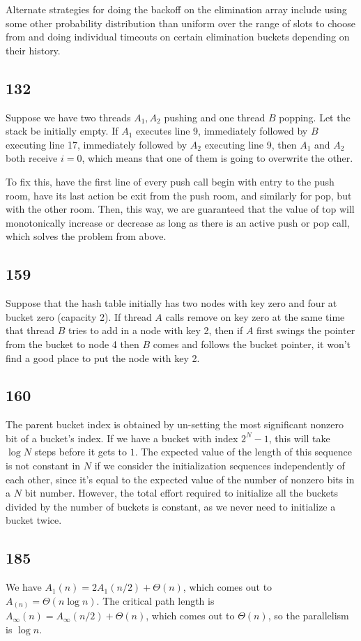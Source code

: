 \documentclass{article}
\begin{document}
Alternate strategies for doing the backoff on the elimination array include using some other probability distribution than uniform over the range of slots to choose from and doing individual timeouts on certain elimination buckets depending on their history.
\subsection*{132}
Suppose we have two threads $A_1, A_2$ pushing and one thread $B$ popping. Let the stack be initially empty. If $A_1$ executes line 9, immediately followed by $B$ executing line 17, immediately followed by $A_2$ executing line 9, then $A_1$ and $A_2$ both receive $i=0$, which means that one of them is going to overwrite the other.

To fix this, have the first line of every push call begin with entry to the push room, have its last action be exit from the push room, and similarly for pop, but with the other room. Then, this way, we are guaranteed that the value of top will monotonically increase or decrease as long as there is an active push or pop call, which solves the problem from above.
\subsection*{159}
Suppose that the hash table initially has two nodes with key zero and four at bucket zero (capacity 2). If thread $A$ calls remove on key zero at the same time that thread $B$ tries to add in a node with key 2, then if $A$ first swings the pointer from the bucket to node 4 then $B$ comes and follows the bucket pointer, it won't find a good place to put the node with key 2.
\subsection*{160}
The parent bucket index is obtained by un-setting the most significant nonzero bit of a bucket's index. If we have a bucket with index $2^N-1$, this will take $\log N$ steps before it gets to $1$. The expected value of the length of this sequence is not constant in $N$ if we consider the initialization sequences independently of each other, since it's equal to the expected value of the number of nonzero bits in a $N$ bit number. However, the total effort required to initialize all the buckets divided by the number of buckets is constant, as we never need to initialize a bucket twice.
\subsection*{185}
We have $A_1(n)=2A_1(n/2)+\Theta(n)$, which comes out to $A_(n)=\Theta(n\log n)$. The critical path length is $A_\infty(n)=A_\infty(n/2)+\Theta(n)$, which comes out to $\Theta(n)$, so the parallelism is $\log n$.
\end{document}
